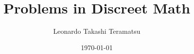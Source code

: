 \documentclass[a4paper, 12pt]{book}
\begin{document}
\title{Problems in Discreet Math}
\author{Leonardo Takashi Teramatsu}
\date{\today}

\maketitle

\tableofcontents
\newpage %



\end{document}
